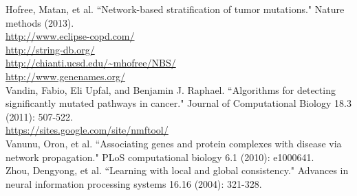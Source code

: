 \documentclass[11pt]{article}
\begin{document}
\begin{thebibliography}{9}
Hofree, Matan, et al. ``Network-based stratification of tumor mutations." Nature methods (2013).\\[-20pt]
\url{http://www.eclipse-copd.com/}\\[-20pt]
\url{http://string-db.org/}\\[-20pt]
\url{http://chianti.ucsd.edu/~mhofree/NBS/}\\[-20pt]
\url{http://www.genenames.org/}\\[-20pt]
Vandin, Fabio, Eli Upfal, and Benjamin J. Raphael. ``Algorithms for detecting significantly mutated pathways in cancer." Journal of Computational Biology 18.3 (2011): 507-522.\\[-20pt]
\url{https://sites.google.com/site/nmftool/}\\[-20pt]
Vanunu, Oron, et al. ``Associating genes and protein complexes with disease via network propagation." PLoS computational biology 6.1 (2010): e1000641.\\[-20pt]
Zhou, Dengyong, et al. ``Learning with local and global consistency." Advances in neural information processing systems 16.16 (2004): 321-328.\\[-20pt]
\end{thebibliography}
\end{document}

